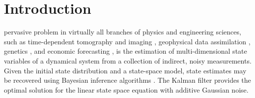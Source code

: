 \documentclass[journal]{IEEEtran}
\begin{document}
\vspace{-.5cm}
\section{Introduction}

 pervasive problem in virtually all branches of physics and engineering sciences, such as time-dependent tomography and imaging \cite{rem1,rem2}, geophysical data assimilation \cite{geo}, genetics \cite{gene}, and economic forecasting \cite{eco}, is the estimation of multi-dimensional state variables of a dynamical system from a collection of indirect, noisy measurements. Given the initial state distribution and a state-space model, state estimates may be recovered using Bayesian inference algorithms \cite{bayes}. The Kalman filter \cite{kalman} provides the optimal solution for the linear state space equation with additive Gaussian noise\cite{lin}.  %


\end{document}
